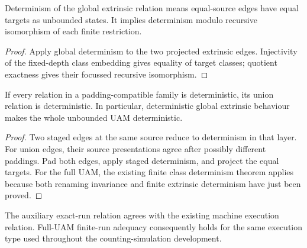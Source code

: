 \begin{lemma}
Determinism of the global extrinsic relation means equal-source edges have equal targets as unbounded states. It implies determinism modulo recursive isomorphism of each finite restriction.
\end{lemma}

\begin{proof}
Apply global determinism to the two projected extrinsic edges. Injectivity of the fixed-depth class embedding gives equality of target classes; quotient exactness gives their focussed recursive isomorphism.
\end{proof}




\begin{lemma}
If every relation in a padding-compatible family is deterministic, its union relation is deterministic. In particular, deterministic global extrinsic behaviour makes the whole unbounded UAM deterministic.
\end{lemma}

\begin{proof}
Two staged edges at the same source reduce to determinism in that layer. For union edges, their source presentations agree after possibly different paddings. Pad both edges, apply staged determinism, and project the equal targets. For the full UAM, the existing finite class determinism theorem applies because both renaming invariance and finite extrinsic determinism have just been proved.
\end{proof}





\begin{lemma}
The auxiliary exact-run relation agrees with the existing machine execution relation. Full-UAM finite-run adequacy consequently holds for the same execution type used throughout the counting-simulation development.
\end{lemma}

